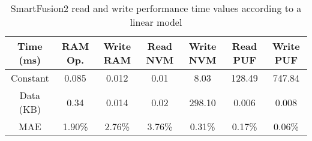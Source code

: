 \begin{table}[h!]
\centering
\def\arraystretch{1.5}
\begin{tabular}{|c|c|c|c|c|c|c|}
\hline
Time (ms) & RAM Op. & Write RAM & Read NVM & Write NVM & Read PUF & Write PUF \\ \hline
Constant  & 0.085     & 0.012     & 0.01     & 8.03      & 128.49    & 747.84  \\ \hline
Data (KB) & 0.34     & 0.014     & 0.02     & 298.10    & 0.006     & 0.008  \\ \hline
MAE       & 1.90\%    & 2.76\%    & 3.76\%   & 0.31\%    & 0.17\%    & 0.06\%  \\ \hline
\end{tabular}
\caption{SmartFusion2 read and write performance time values according to a linear model}
\label{tab:memory-model}
\end{table}
